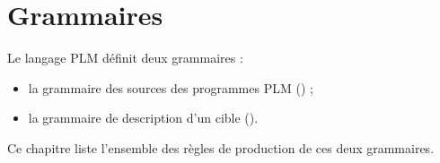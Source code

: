 




\chapter{Grammaires}

Le langage PLM définit deux grammaires :
\begin{itemize}
\item la grammaire des sources des programmes PLM () ;
\item la grammaire de description d'un cible ().
\end{itemize}

Ce chapitre liste l'ensemble des règles de production de ces deux grammaires.


